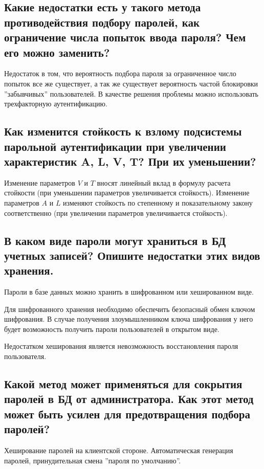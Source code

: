 \subsection{Какие недостатки есть у такого метода
  противодействия подбору паролей, как ограничение числа
  попыток ввода пароля? Чем его можно заменить?}

  Недостаток в том, что вероятность подбора пароля за ограниченное число
  попыток все же существует, а так же существует вероятность частой блокировки
  ''забывчивых'' пользователей. В качестве решения проблемы можно использовать
  трехфакторную аутентификацию.

\subsection{Как изменится стойкость к взлому подсистемы
  парольной аутентификации при увеличении характеристик A, L,
  V, T? При их уменьшении?}

  Изменение параметров $V$ и $T$ вносят линейный вклад в формулу расчета
  стойкости (при уменьшении параметров увеличивается стойкость). Изменение
  параметров $A$ и $L$ изменяют стойкость по степенному и показательному закону
  соответственно (при увеличении параметров увеличивается стойкость).

\subsection{В каком виде пароли могут храниться в БД учетных
  записей? Опишите недостатки этих видов хранения.}

  Пароли в базе данных можно хранить в шифрованном или хешированном виде.

  Для шифрованного хранения необходимо обеспечить безопасный обмен ключом
  шифрования. В случае получения злоумышленником ключа шифрования у него будет
  возможность получить пароли пользователей в открытом виде.

  Недостатком хеширования является невозможность восстановления пароля
  пользователя.

\subsection{Какой метод может применяться для сокрытия паролей
  в БД от администратора. Как этот метод может быть усилен для
  предотвращения подбора паролей?}

  Хеширование паролей на клиентской стороне. Автоматическая генерация паролей,
  принудительная смена ''пароля по умолчанию''.


